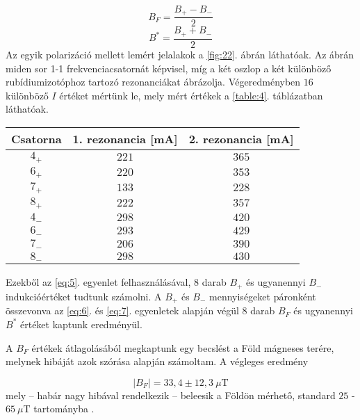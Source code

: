 \begin{multicols}{2}
\begin{equation} \label{eq:6}
B_{F}
=
\frac{B_{+} - B_{-}}{2}
\end{equation}
\begin{equation} \label{eq:7}
B^{\ast}
=
\frac{B_{+} + B_{-}}{2}
\end{equation}
Az egyik polarizáció mellett lemért jelalakok a \ref{fig:22}. ábrán láthatóak. Az ábrán miden sor 1-1 frekvenciacsatornát képvisel, míg a két oszlop a két különböző rubídiumizotóphoz tartozó rezonanciákat ábrázolja. Végeredményben $16$ különböző $I$ értéket mértünk le, mely mért értékek a \ref{table:4}. táblázatban láthatóak.


\begin{center}
\begin{tabular}{|c|c|c|}
\hline
Csatorna & 1. rezonancia [mA] & 2. rezonancia [mA] \\ \hline \hline
$4_{+}$  & $221$              & $365$              \\ \hline
$6_{+}$  & $220$              & $353$              \\ \hline
$7_{+}$  & $133$              & $228$              \\ \hline
$8_{+}$  & $222$              & $357$              \\ \hline
$4_{-}$  & $298$              & $420$              \\ \hline
$6_{-}$  & $293$              & $429$              \\ \hline
$7_{-}$  & $206$              & $390$              \\ \hline
$8_{-}$  & $298$              & $430$              \\ \hline
\end{tabular}
 \label{table:4}
\end{center}
Ezekből az \ref{eq:5}. egyenlet felhasználásával, $8$ darab $B_{+}$ és ugyanennyi $B_{-}$ indukcióértéket tudtunk számolni. A $B_{+}$ és $B_{-}$ mennyiségeket páronként összevonva az \ref{eq:6}. és \ref{eq:7}. egyenletek alapján végül 8 darab $B_{F}$ és ugyanennyi $B^{\ast}$ értéket kaptunk eredményül. \par
A $B_{F}$ értékek átlagolásából megkaptunk egy becslést a Föld mágneses terére, melynek hibáját azok szórása alapján számoltam. A végleges eredmény

\begin{equation}
\left| B_{F} \right|
=
33,4 \pm 12,3\ \mu \text{T}
\end{equation}
mely -- habár nagy hibával rendelkezik -- beleesik a Földön mérhető, standard $25$ - $65\ \mu \text{T}$ tartományba \citep{2010GeoJI.183.1216F}.


\end{multicols}

